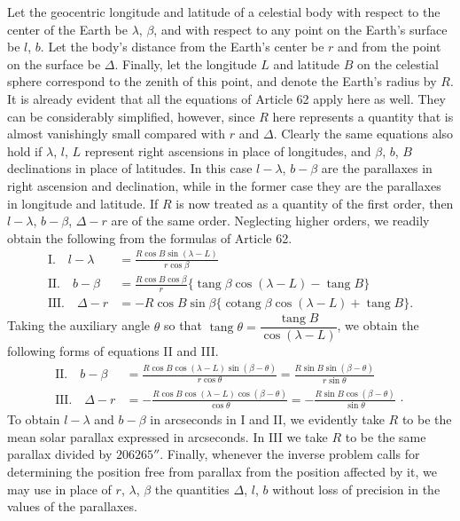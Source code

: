 Let the geocentric longitude and latitude of a celestial body with respect to the center of the Earth be $\lambda$, $\beta$, and with respect to any point on the Earth's surface be $l$, $b$. Let the body's distance from the Earth's center be $r$ and from the point on the surface be $\Delta$. Finally, let the longitude $L$ and latitude $B$ on the celestial sphere correspond to the zenith of this point, and denote the Earth's radius by $R$. It is already evident that all the equations of Article 62 apply here as well. They can be considerably simplified, however, since $R$ here represents a quantity that is almost vanishingly small compared with $r$ and $\Delta$. Clearly the same equations also hold if $\lambda$, $l$, $L$ represent right ascensions in place of longitudes, and $\beta$, $b$, $B$ declinations in place of latitudes. In this case $l-\lambda$, $b-\beta$ are the parallaxes in right ascension and declination, while in the former case they are the parallaxes in longitude and latitude. If $R$ is now treated as a quantity of the first order, then $l-\lambda$, $b-\beta$, $\Delta-r$ are of the same order. Neglecting higher orders, we readily obtain the following from the formulas of Article 62.
\[
\begin{aligned}
\mathrm{I.}\quad l-\lambda&=\frac{R\cos B\sin(\lambda-L)}{r\cos\beta}\\[.5em]
\mathrm{II.}\quad b-\beta&=\frac{R\cos B\cos\beta}{r}\{\operatorname{tang}\beta\cos(\lambda-L)-\operatorname{tang}B\}\\[.5em]
\mathrm{III.}\quad \Delta-r&=-R\cos B\sin\beta\{\operatorname{cotang}\beta\cos(\lambda-L)+\operatorname{tang}B\}.
\end{aligned}
\]
\noindent Taking the auxiliary angle $\theta$ so that $\operatorname{tang}\theta=\dfrac{\operatorname{tang}B}{\cos(\lambda-L)}$, we obtain the following forms of equations II and III.
\[
\begin{aligned}
\mathrm{II.}\quad b-\beta&=\frac{R\cos B\cos(\lambda-L)\sin(\beta-\theta)}{r\cos\theta}=\frac{R\sin B\sin(\beta-\theta)}{r\sin\theta}\\[.5em]
\mathrm{III.}\quad \Delta-r&=-\frac{R\cos B\cos(\lambda-L)\cos(\beta-\theta)}{\cos\theta}=-\frac{R\sin B\cos(\beta-\theta)}{\sin\theta}\,\cdot
\end{aligned}
\]
\noindent To obtain $l-\lambda$ and $b-\beta$ in arcseconds in I and II, we evidently take $R$ to be the mean solar parallax expressed in arcseconds. In III we take $R$ to be the same parallax divided by $206265''$. Finally, whenever the inverse problem calls for determining the position free from parallax from the position affected by it, we may use in place of $r$, $\lambda$, $\beta$ the quantities $\Delta$, $l$, $b$ without loss of precision in the values of the parallaxes.

